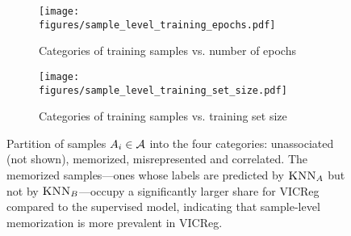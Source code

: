 \begin{figure}[ht]
     \centering
     \begin{subfigure}[b]{0.49\textwidth}
         \centering
         \texttt{[image: figures/sample\_level\_training\_epochs.pdf]}
         \caption{Categories of training samples vs. number of epochs}
         \label{fig:sample level epochs}
     \end{subfigure}
     \hfill
     \begin{subfigure}[b]{0.49\textwidth}
         \centering
         \texttt{[image: figures/sample\_level\_training\_set\_size.pdf]}
         \caption{Categories of training samples vs. training set size}
         \label{fig:sample level training size}
     \end{subfigure}
\caption{
Partition of samples $A_i \in \mathcal{A}$ into the four categories: {\color{gray}unassociated} (not shown), {\color{part_orange}memorized}, {\color{part_red}misrepresented} and {\color{part_blue}correlated}. The {\color{part_orange}memorized} samples---ones whose labels are predicted by $\textsc{KNN}_A$ but not by $\textsc{KNN}_B$---occupy a significantly larger share for VICReg compared to the supervised model, indicating that sample-level \dejavu memorization is more prevalent in VICReg. %
}
\label{fig:partition attack main appendix}
\end{figure}